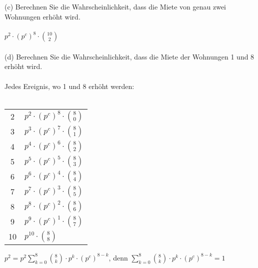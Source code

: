 \documentclass[a4paper]{article}
\begin{document}
(c) Berechnen Sie die Wahrscheinlichkeit, dass die Miete von genau zwei Wohnungen erhöht wird.\\\\
$p^2 \cdot (p^c)^8 \cdot \binom{10}{2}$\\\\
(d) Berechnen Sie die Wahrscheinlichkeit, dass die Miete der Wohnungen 1 und 8 erhöht wird.\\\\ 
Jedes Ereignis, wo 1 und 8 erhöht werden:\\\\
\begin{tabular}{c|l}
    2 & $p^2 \cdot (p^c)^8 \cdot \binom{8}{0}$\\
    3 & $p^3 \cdot (p^c)^7 \cdot \binom{8}{1}$\\
    4 & $p^4 \cdot (p^c)^6 \cdot \binom{8}{2}$\\
    5 & $p^5 \cdot (p^c)^5 \cdot \binom{8}{3}$\\
    6 & $p^6 \cdot (p^c)^4 \cdot \binom{8}{4}$\\
    7 & $p^7 \cdot (p^c)^3 \cdot \binom{8}{5}$\\
    8 & $p^8 \cdot (p^c)^2 \cdot \binom{8}{6}$\\
    9 & $p^9 \cdot (p^c)^1 \cdot \binom{8}{7}$\\
    10 & $p^{10} \cdot \binom{8}{8}$
\end{tabular}
\hspace*{2cm}\(p^2 = p^2 \sum\limits^8_{k=0}\binom{8}{k}\cdot p^k \cdot (p^c)^{8-k}\), denn $\sum\limits^8_{k=0}\binom{8}{k}\cdot p^k \cdot (p^c)^{8-k}=1$
\end{document}
